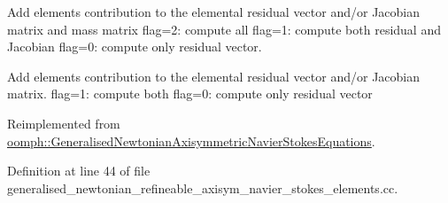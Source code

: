 Add element\textquotesingle{}s contribution to the elemental residual vector and/or Jacobian matrix and mass matrix flag=2\+: compute all flag=1\+: compute both residual and Jacobian flag=0\+: compute only residual vector. 

Add element\textquotesingle{}s contribution to the elemental residual vector and/or Jacobian matrix. flag=1\+: compute both flag=0\+: compute only residual vector 

Reimplemented from \hyperlink{classoomph_1_1GeneralisedNewtonianAxisymmetricNavierStokesEquations_ad41c00dfe90c6dbc9e53fac71f20489e}{oomph\+::\+Generalised\+Newtonian\+Axisymmetric\+Navier\+Stokes\+Equations}.



Definition at line 44 of file generalised\+\_\+newtonian\+\_\+refineable\+\_\+axisym\+\_\+navier\+\_\+stokes\+\_\+elements.\+cc.



